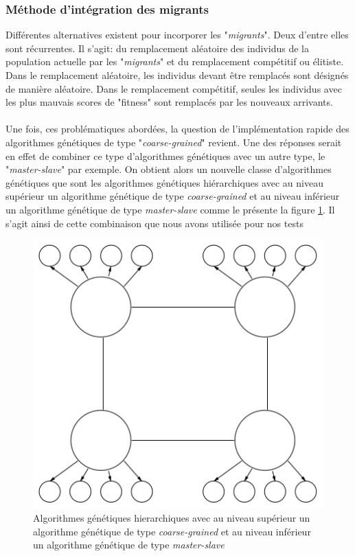 \documentclass[12pt,a4paper]{article}
\begin{document}
	\subsubsection{Méthode d'intégration des migrants}
 	Différentes alternatives existent pour incorporer les "\emph{migrants}". Deux d'entre elles sont récurrentes. Il s'agit: du remplacement aléatoire des individus de la population actuelle par les "\emph{migrants}" et du remplacement compétitif ou élitiste. Dans le remplacement aléatoire, les individus devant être remplacés sont désignés de manière aléatoire. Dans le remplacement compétitif, seules les individus avec les plus mauvais scores de "fitness" sont remplacés par les nouveaux arrivants.\\
 	\\
 	\hspace*{.5cm} Une fois, ces problématiques abordées, la question de l'implémentation rapide des algorithmes génétiques de type "\emph{coarse-grained}" revient. Une des réponses serait en effet de combiner ce type d'algorithmes génétiques avec un autre type, le "\emph{master-slave}" par exemple. On obtient alors un nouvelle classe d'algorithmes génétiques que sont les algorithmes génétiques hiérarchiques avec au niveau supérieur un algorithme génétique de type \emph{coarse-grained} et au niveau inférieur un algorithme génétique de type \emph{master-slave} comme le présente la figure \ref{fig:hierarchical_gene1_fig}. Il s'agit ainsi de cette combinaison que nous avons utilisée pour nos tests
 	
	\begin{figure}[!h]
		\begin{center}
			\includegraphics[scale=.3]{img/hierarchical_gene1_fig.png}
			\caption{Algorithmes génétiques hierarchiques avec au niveau supérieur un algorithme génétique de type \emph{coarse-grained} et au niveau inférieur un algorithme génétique de type \emph{master-slave}}
			\label{fig:hierarchical_gene1_fig}
		\end{center}
	\end{figure} 	
 	
\end{document}
